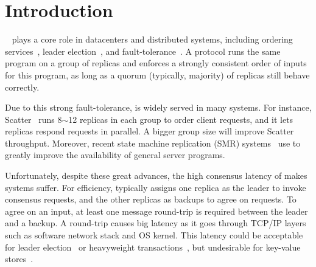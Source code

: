 \section{Introduction} \label{sec:intro}


\paxos~\cite{paxos:practical,paxos,paxos:simple,paxos:complex} plays a core
role in datacenters and distributed systems, including ordering
services~\cite{ellis:thesis,manos:hotdep10,scatter:sosp11},
leader election~\cite{zookeeper, chubby:osdi}, and
fault-tolerance~\cite{eve:osdi12,rex:eurosys14,crane:sosp15}. A \paxos protocol
runs the same program on a group of replicas and enforces a strongly
consistent order of inputs for this program, as long as a quorum (typically,
majority) of replicas still behave correctly.

Due to this strong fault-tolerance, \paxos is widely served in many systems.
For instance, Scatter~\cite{scatter:sosp11} runs 8$\sim$12 replicas in each
\paxos group to order client requests, and it lets replicas respond requests
in parallel. A bigger group size will improve Scatter throughput. 
Moreover, recent state machine replication (SMR) 
systems~\cite{eve:osdi12,rex:eurosys14,crane:sosp15} use \paxos to greatly 
improve the availability of
general server programs.






Unfortunately, despite these great advances, the high consensus latency of 
\paxos makes systems suffer. For efficiency, \paxos typically assigns one 
replica as the leader to invoke consensus requests, and the other replicas as 
backups to agree on requests. To agree on an input, at least one message 
round-trip is required between the leader and a backup. A round-trip causes big 
latency as it goes through TCP/IP layers such as software network stack and OS 
kernel. This latency could be acceptable for leader 
election~\cite{chubby:osdi,zookeeper} or
heavyweight transactions~\cite{crane:sosp15,eve:osdi12}, but undesirable for
key-value stores~\cite{redis,memcached}.

